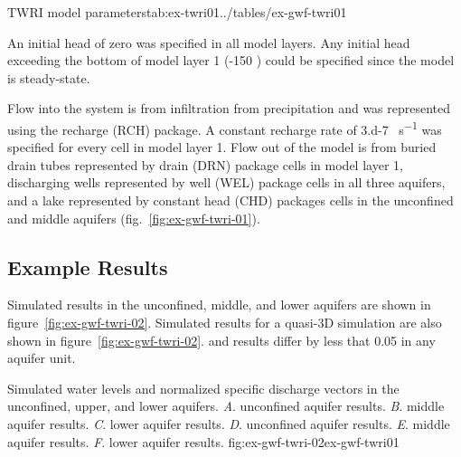 \begin{StandardTable}{TWRI model parameters}{tab:ex-twri01}{../tables/ex-gwf-twri01}
\end{StandardTable}

An initial head of zero \si{\feet} was specified in all model layers. Any initial head exceeding the bottom of model layer 1 (-150 \si{\feet}) could be specified since the model is steady-state.

Flow into the system is from infiltration from precipitation and was represented using the recharge (RCH) package. A constant recharge rate of \num{3.d-7} \si{\feet\per\second} was specified for every cell in model layer 1. Flow out of the model is from buried drain tubes represented by drain (DRN) package cells in model layer 1, discharging wells represented by well (WEL) package cells in all three aquifers, and a lake represented by constant head (CHD) packages cells in the unconfined and middle aquifers (fig.~\ref{fig:ex-gwf-twri-01}).

\subsection{Example Results}

Simulated results in the unconfined, middle, and lower aquifers are shown in figure~\ref{fig:ex-gwf-twri-02}. Simulated results for a quasi-3D \mff simulation are also shown in figure~\ref{fig:ex-gwf-twri-02}. \mf and \mff results differ by less that 0.05 \si{\feet} in any aquifer unit.

\begin{StandardFigure}{
                                     Simulated water levels and normalized specific discharge vectors in 
                                     the unconfined, upper, and lower aquifers. 
                                     \textit{A}. \mf unconfined aquifer results.
                                     \textit{B}. \mf middle aquifer results.
                                     \textit{C}. \mf lower aquifer results.
                                     \textit{D}. \mff unconfined aquifer results.
                                     \textit{E}. \mff middle aquifer results.
                                     \textit{F}. \mff lower aquifer results.
                                     }{fig:ex-gwf-twri-02}{ex-gwf-twri01}
\end{StandardFigure}                                 


